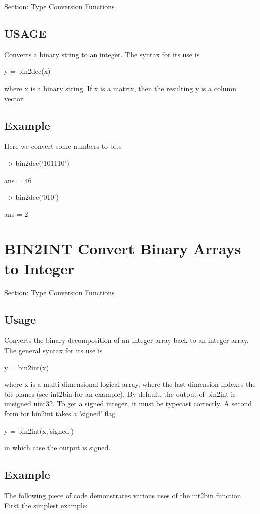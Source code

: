 Section\-: \hyperlink{sec_typecast}{Type Conversion Functions} \hypertarget{typecast_dec2bin_USAGE}{}\subsection{U\-S\-A\-G\-E}\label{typecast_dec2bin_USAGE}
Converts a binary string to an integer. The syntax for its use is \begin{DoxyVerb}   y = bin2dec(x)
\end{DoxyVerb}
 where {\ttfamily x} is a binary string. If {\ttfamily x} is a matrix, then the resulting {\ttfamily y} is a column vector. \hypertarget{variables_struct_Example}{}\subsection{Example}\label{variables_struct_Example}
Here we convert some numbers to bits


\begin{DoxyVerbInclude}
--> bin2dec('101110')

ans = 
 46 

--> bin2dec('010')

ans = 
 2 
\end{DoxyVerbInclude}
 \hypertarget{typecast_bin2int}{}\section{B\-I\-N2\-I\-N\-T Convert Binary Arrays to Integer}\label{typecast_bin2int}
Section\-: \hyperlink{sec_typecast}{Type Conversion Functions} \hypertarget{vtkwidgets_vtkxyplotwidget_Usage}{}\subsection{Usage}\label{vtkwidgets_vtkxyplotwidget_Usage}
Converts the binary decomposition of an integer array back to an integer array. The general syntax for its use is \begin{DoxyVerb}   y = bin2int(x)
\end{DoxyVerb}
 where {\ttfamily x} is a multi-\/dimensional logical array, where the last dimension indexes the bit planes (see {\ttfamily int2bin} for an example). By default, the output of {\ttfamily bin2int} is unsigned {\ttfamily uint32}. To get a signed integer, it must be typecast correctly. A second form for {\ttfamily bin2int} takes a {\ttfamily 'signed'} flag \begin{DoxyVerb}   y = bin2int(x,'signed')
\end{DoxyVerb}
 in which case the output is signed. \hypertarget{variables_struct_Example}{}\subsection{Example}\label{variables_struct_Example}
The following piece of code demonstrates various uses of the int2bin function. First the simplest example\-:


